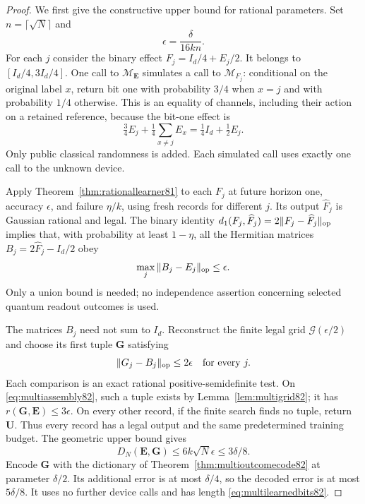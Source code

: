\begin{proof}
We first give the constructive upper bound for rational parameters.
Set $n=\lceil\sqrt N\rceil$ and
\begin{equation}\label{eq:multitrainingaccuracy82}
 \epsilon=\frac{\delta}{16kn}.
\end{equation}
For each $j$ consider the binary effect
$F_j=I_d/4+E_j/2$.  It belongs to $[I_d/4,3I_d/4]$.
One call to $\mathcal M_{\boldsymbol E}$ simulates a call to
$\mathcal M_{F_j}$: conditional on the original label $x$, return
bit one with probability $3/4$ when $x=j$ and with probability
$1/4$ otherwise.  This is an equality of channels, including their
action on a retained reference, because the bit-one effect is
\[
 \tfrac34E_j+\tfrac14\sum_{x\ne j}E_x=\tfrac14I_d+\tfrac12E_j.
\]
Only public classical randomness is added.  Each simulated call
uses exactly one call to the unknown device.

Apply Theorem~\ref{thm:rationallearner81} to each $F_j$ at future
horizon one, accuracy $\epsilon$, and failure $\eta/k$, using
fresh records for different $j$.  Its output $\widehat F_j$ is
Gaussian rational and legal.  The binary identity
$d_1(F_j,\widehat F_j)=2\|F_j-\widehat F_j\|_{\rm op}$ implies
that, with probability at least $1-\eta$, all the Hermitian
matrices $B_j=2\widehat F_j-I_d/2$ obey
\begin{equation}\label{eq:multiassembly82}
 \max_j\|B_j-E_j\|_{\rm op}\le\epsilon.
\end{equation}
Only a union bound is needed; no independence assertion concerning
selected quantum readout outcomes is used.

The matrices $B_j$ need not sum to $I_d$.  Reconstruct the finite
legal grid $\mathcal G(\epsilon/2)$ and choose its first tuple
$\boldsymbol G$ satisfying
\[
 \|G_j-B_j\|_{\rm op}\le2\epsilon\quad\text{for every }j.
\]
Each comparison is an exact rational positive-semidefinite test.
On \eqref{eq:multiassembly82}, such a tuple exists by
Lemma~\ref{lem:multigrid82}; it has
$r(\boldsymbol G,\boldsymbol E)\le3\epsilon$.
On every other record, if the finite search finds no tuple, return
$\boldsymbol U$.  Thus every record has a legal output and the
same predetermined training budget.  The geometric upper bound gives
\[
 D_N(\boldsymbol E,\boldsymbol G)
       \le6k\sqrt N\epsilon\le3\delta/8.
\]
Encode $\boldsymbol G$ with the dictionary of
Theorem~\ref{thm:multioutcomecode82} at parameter $\delta/2$.
Its additional error is at most $\delta/4$, so the decoded error
is at most $5\delta/8$.  It uses no further device calls and has
length \eqref{eq:multilearnedbits82}.


\end{proof}
